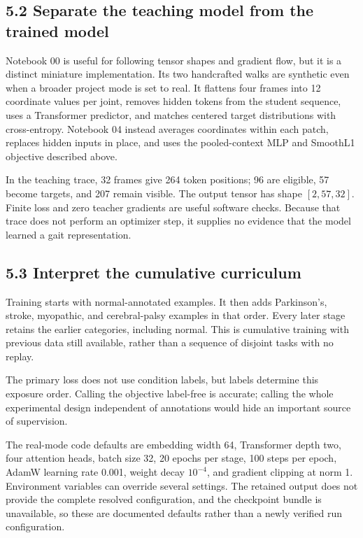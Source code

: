 \documentclass[11pt,letterpaper]{article}
\begin{document}
\subsection{5.2 Separate the teaching model from the trained
model}\label{separate-the-teaching-model-from-the-trained-model}

Notebook 00 is useful for following tensor shapes and gradient flow, but
it is a distinct miniature implementation. Its two handcrafted walks are
synthetic even when a broader project mode is set to real. It flattens
four frames into 12 coordinate values per joint, removes hidden tokens
from the student sequence, uses a Transformer predictor, and matches
centered target distributions with cross-entropy. Notebook 04 instead
averages coordinates within each patch, replaces hidden inputs in place,
and uses the pooled-context MLP and SmoothL1 objective described above.

In the teaching trace, 32 frames give 264 token positions; 96 are
eligible, 57 become targets, and 207 remain visible. The output tensor
has shape \([2,57,32]\). Finite loss and zero teacher gradients are
useful software checks. Because that trace does not perform an optimizer
step, it supplies no evidence that the model learned a gait
representation.

\subsection{5.3 Interpret the cumulative
curriculum}\label{interpret-the-cumulative-curriculum}

Training starts with normal-annotated examples. It then adds
Parkinson's, stroke, myopathic, and cerebral-palsy examples in that
order. Every later stage retains the earlier categories, including
normal. This is cumulative training with previous data still available,
rather than a sequence of disjoint tasks with no replay.

The primary loss does not use condition labels, but labels determine
this exposure order. Calling the objective label-free is accurate;
calling the whole experimental design independent of annotations would
hide an important source of supervision.

The real-mode code defaults are embedding width 64, Transformer depth
two, four attention heads, batch size 32, 20 epochs per stage, 100 steps
per epoch, AdamW learning rate 0.001, weight decay \(10^{-4}\), and
gradient clipping at norm 1. Environment variables can override several
settings. The retained output does not provide the complete resolved
configuration, and the checkpoint bundle is unavailable, so these are
documented defaults rather than a newly verified run configuration.
\end{document}
